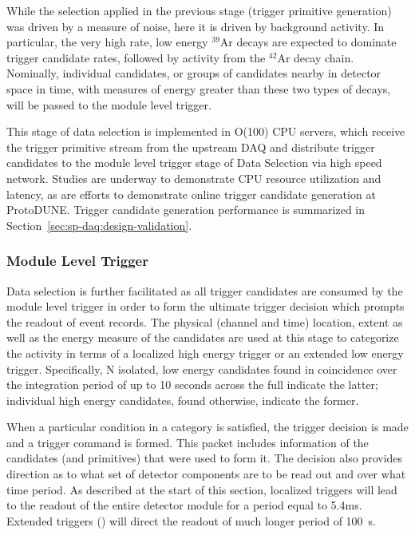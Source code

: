 While the selection applied in the previous stage (trigger primitive
generation) was driven by a
measure of noise, here it is driven by background activity.  
In particular, the very high rate, low energy
$^{39}$Ar decays are expected to dominate 
trigger candidate rates, followed by activity from the $^{42}$Ar decay
chain. Nominally, individual candidates, or
groups of candidates nearby in detector space in time, with measures of
energy greater than these two types of decays, will be passed to the
module level trigger. 

This stage of data selection is
implemented in O(100) CPU servers, which receive the trigger primitive
stream from the upstream DAQ and distribute trigger candidates to the
module level trigger stage of Data Selection via high speed network. Studies are
underway to demonstrate CPU resource utilization and latency, as are
efforts to demonstrate online trigger candidate generation at ProtoDUNE.
Trigger candidate generation performance is summarized in
Section~\ref{sec:sp-daq:design-validation}.



\subsubsection{Module Level Trigger}

Data selection is further facilitated as all trigger candidates are consumed
by the module level trigger in order to form the ultimate trigger
decision which prompts the readout of event records. 
The physical (channel and time) location, extent as well as the energy measure of the
candidates are used at this stage to categorize the activity in terms
of a localized high energy trigger or an extended low energy trigger. 
Specifically, N isolated, low energy candidates found in coincidence
over the integration period of up to 10 seconds across the full 
indicate the latter; individual high energy candidates, found
otherwise, indicate the former.

When a particular condition in a category is satisfied, the trigger
decision is made and a trigger command is formed. 
This packet includes information of the candidates (and primitives)
that were used to form it. 
The decision also provides direction as to what set of detector components
are to be read out and over what time period.
As described at the start of this section, localized triggers will lead
to the readout of the entire detector module for a period equal to 5.4\si{\milli\second}.  Extended triggers () will
direct the readout of much longer period of \SI{100}{s}.

